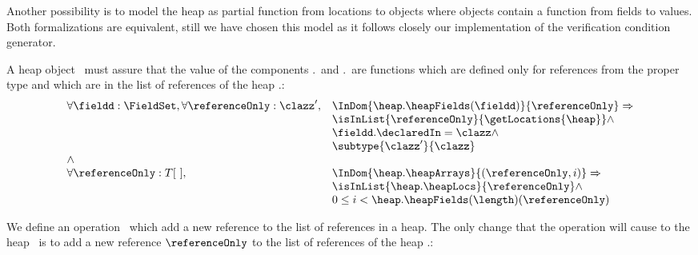  Another possibility is to model the heap as partial function from locations to objects where objects contain a function from 
 fields to values. Both formalizations are equivalent, still we have chosen this model as it follows closely our implementation
 of the verification condition generator.

 A heap object \heap \ must assure that the value of the components \heap.\heapFields \ and \heap.\heapArrays \
 are functions which are defined only for references from the proper
 type and which are in the list of references of the heap \heap.\heapLocs:
 $$\begin{array}{ll}
          \forall  \fieldd : \FieldSet, \forall \referenceOnly: \clazz', &  \InDom{ \heap.\heapFields(\fieldd)}{\referenceOnly } \Rightarrow \\
	  & \isInList{\referenceOnly}{ \getLocations{\heap}} \wedge \\
	  & \fieldd.\declaredIn = \clazz \wedge \\
	  & \subtype{\clazz'}{\clazz} \\
	  \wedge &  \\
	  \forall \referenceOnly : T \lbrack \ \rbrack, &  \InDom{ \heap.\heapArrays}{(\referenceOnly  , i )} \Rightarrow \\
	  & \isInList{\heap.\heapLocs}{  \referenceOnly }\wedge \\
	  & 0 \leq i < \heap.\heapFields( \length)( \referenceOnly)  
	 
   \end{array}
  $$



 





 We define an operation \addNewLocationOnly \  which add a new reference to the list of references in a heap.
 The only change that the operation will cause to the heap \heap \ is to add
 a new reference $\referenceOnly$ to the list of references of the heap \heap.\heapLocs:   

